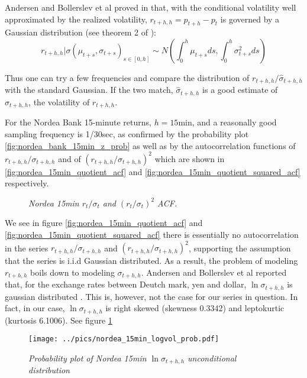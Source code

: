 Andersen and Bollerslev et al proved in \cite{Andersen03} that, with
the conditional volatility well approximated by the realized
volatility, $r_{t+h, h} = p_{t+h} - p_t$ is governed by a Gaussian
distribution (see theorem 2 of \cite{Andersen03}):
\[
r_{t+h, h} | \sigma(\mu_{t+s}, \sigma_{t+s})_{s \in [0, h]} \sim
N(\int_{0}^h \mu_{t+s} ds, \int_{0}^h \sigma_{t+s}^2 ds)
\]

Thus one can try a few frequencies and compare the distribution of
$r_{t+h, h}/\hat{\sigma}_{t+h, h}$ with the standard Gaussian. If the
two match, $\hat{\sigma}_{t+h, h}$ is a good estimate of $\sigma_{t+h,
  h}$, the volatility of $r_{t+h, h}$.

For the Nordea Bank 15-minute returns, $h = 15\text{min}$, and a
reasonally good sampling frequency is 1/30sec, as confirmed by the
probability plot \ref{fig:nordea_bank_15min_z_prob} as well as by the
autocorrelation functions of $r_{t+h, h} / \sigma_{t+h, h}$ and of
$(r_{t+h, h} / \sigma_{t+h, h})^2$ which are shown in
\ref{fig:nordea_15min_quotient_acf} and
\ref{fig:nordea_15min_quotient_squared_acf} respectively.
\begin{figure}[htb!]
  \centering
  \caption{\small \it Nordea 15min $r_t/\sigma_t$ and
    $(r_t/\sigma_t)^2$ ACF.}
\end{figure}

We see in figure \ref{fig:nordea_15min_quotient_acf} and
\ref{fig:nordea_15min_quotient_squared_acf} there is essentially no
autocorrelation in the series $r_{t+h, h} / \sigma_{t+h, h}$ and
$(r_{t+h, h} / \sigma_{t+h, h})^2$, supporting the assumption that the
series is i.i.d Gaussian distributed. As a result, the problem of
modeling $r_{t+h, h}$ boils down to modeling $\sigma_{t+h,
  h}$. Andersen and Bollerslev et al reported that, for the exchange
rates between Deutch mark, yen and dollar, $\ln \sigma_{t+h, h}$ is
gaussian distributed \cite{Andersen03}. This is, however, not the case
for our series in question. In fact, in our case, $\ln \sigma_{t+h,
  h}$ is right skewed (skewness 0.3342) and leptokurtic (kurtosis
6.1006). See figure \ref{fig:nordea_15min_logvol_prob}
\begin{figure}[htb!]
  \centering
  \texttt{[image: ../pics/nordea\_15min\_logvol\_prob.pdf]}
  \caption{\small \it Probability plot of Nordea 15min
    $\ln\sigma_{t+h, h}$ unconditional distribution}
  \label{fig:nordea_15min_logvol_prob}
\end{figure}

